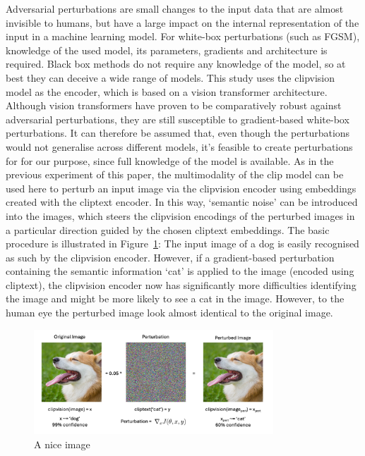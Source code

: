 Adversarial perturbations are small changes to the input data that are almost invisible to humans, but have a large impact on the internal representation of the input in a machine learning model. For white-box perturbations (such as FGSM\cite{goodfellowExplainingHarnessingAdversarial2014}), knowledge of the used model, its parameters, gradients and architecture is required. Black box methods do not require any knowledge of the model, so at best they can deceive a wide range of models\cite{papernotPracticalBlackBoxAttacks2017}. This study uses the clipvision model as the encoder, which is based on a vision transformer architecture\cite{dosovitskiyImageWorth16x162021}. Although vision transformers have proven to be comparatively robust against adversarial perturbations, they are still susceptible to gradient-based white-box perturbations\cite{naseerIntriguingPropertiesVision2021}. It can therefore be assumed that, even though the perturbations would not generalise across different models, it's feasible to create perturbations for for our purpose, since full knowledge of the model is available. As in the previous experiment of this paper, the multimodality of the clip model can be used here to perturb an input image via the clipvision encoder using embeddings created with the cliptext encoder. In this way, `semantic noise' can be introduced into the images, which steers the clipvision encodings of the perturbed images in a particular direction guided by the chosen cliptext embeddings. The basic procedure is illustrated in Figure~\ref{fig:perturbation_example}: The input image of a dog is easily recognised as such by the clipvision encoder. However, if a gradient-based perturbation containing the semantic information `cat' is applied to the image  (encoded using cliptext), the clipvision encoder now has significantly more difficulties identifying the image and might be more likely to see a cat in the image. However, to the human eye the perturbed image look almost identical to the original image.

\begin{figure}[ht]
    \centering
    \includegraphics[width=0.8\textwidth]{plots/peturbation_example.png}
    \caption{A nice image}\label{fig:perturbation_example}
\end{figure}

